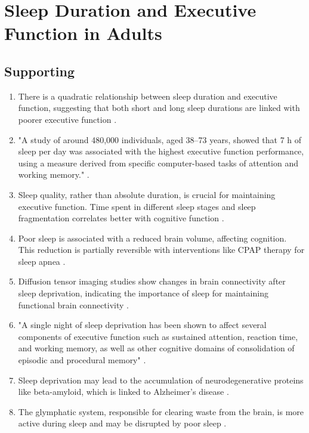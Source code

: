 \section{Sleep Duration and Executive Function in Adults \parencite{2}}

\begin{centering}\subsection{Supporting}\end{centering}

\begin{enumerate}
    \item There is a quadratic relationship between sleep duration and executive function, suggesting that both short and long sleep durations are linked with poorer executive function \parencite[page 801, para. 2]{2}.

    \item "A study of around 480,000 individuals, aged 38–73 years, showed that 7 h of sleep per day was associated with the highest executive function performance, using a measure derived from specific computer-based tasks of attention and working memory." \parencite[page 804, para. 6, fig. 1]{2}.

    \item Sleep quality, rather than absolute duration, is crucial for maintaining executive function. Time spent in different sleep stages and sleep fragmentation correlates better with cognitive function \parencite[page 806, para. 1]{2}.

    \item Poor sleep is associated with a reduced brain volume, affecting cognition. This reduction is partially reversible with interventions like CPAP therapy for sleep apnea \parencite[page 807, para. 1]{2}.

    \item Diffusion tensor imaging studies show changes in brain connectivity after sleep deprivation, indicating the importance of sleep for maintaining functional brain connectivity \parencite[page 807, para. 2]{2}.

    \item "A single night of sleep deprivation has been shown to affect several components of executive function such as sustained attention, reaction time, and working memory, as well as other cognitive domains of consolidation of episodic and procedural memory" \parencite[page 803, para. 3]{2}.

    \item Sleep deprivation may lead to the accumulation of neurodegenerative proteins like beta-amyloid, which is linked to Alzheimer's disease \parencite[page 807, para. 3]{2}.

    \item The glymphatic system, responsible for clearing waste from the brain, is more active during sleep and may be disrupted by poor sleep \parencite[page 807, para. 4]{2}.

\end{enumerate}


